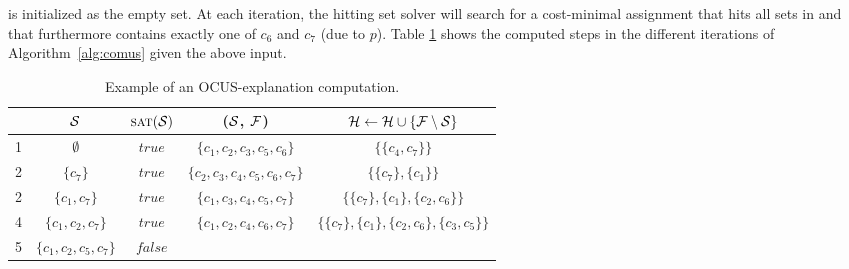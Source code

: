 \begin{example}
	 
\setstohit is initialized as the empty set. At each iteration, the hitting set solver will search for a cost-minimal assignment that hits all sets in \setstohit and that furthermore contains exactly one of $c_6$ and $c_7$ (due to $p$).
	Table \ref{tab:explanation-steps-expanded} shows the computed steps in the different iterations of Algorithm~\ref{alg:comus} given the above input.
\begin{table}[!h]
	\centering
	\begin{adjustbox}{max width=\columnwidth}
			\begin{tabular}{lcccc} 
				&$\mathcal{S}$ & $\textsc{sat}(\mathcal{S})$ & \grow($\mathcal{S}$, $\mathcal{F} $) & $\mathcal{H}  \gets \mathcal{H}  \cup \{  \mathcal{F}  \setminus \mathcal{S}\}$\\ 
				\toprule[2pt]
				1 &$ \emptyset $ & $\mathit{true}$ & $\{c_1, c_2, c_3, c_5, c_6\}$    & $\{ \{c_4, c_7\}\}$   \\
				\midrule	
				2 &$\{ c_7\}$  &$\mathit{true}$ & $\{ c_2, c_3, c_4,c_5, c_6, c_7\}$   & $\{ \{c_7\}, \{c_1\}\}$  \\  
				\midrule
				2 &$\{ c_1, c_7\}$  &$\mathit{true}$ & $\{ c_1, c_3, c_4, c_5, c_7\}$   & $\{ \{c_7\}, \{c_1\}, \{c_2, c_6\}\}$  \\  
%				
				\midrule
				4& $\{ c_1, c_2, c_7 \}$  & $\mathit{true}$ & $\{c_1, c_2, c_4,c_6, c_7 \}$  & $\{ \{c_7\}, \{c_1\}, \{c_2, c_6\}, \{c_3, c_5\}\}$  \\ 
				\midrule
				5&  $\{ c_1, c_2, c_5, c_7 \}$ & $\mathit{false}$ & & \\
			\end{tabular}
	\end{adjustbox}
	\caption{Example of an OCUS-explanation computation.}
	\label{tab:explanation-steps-expanded}
\end{table}
\end{example}

